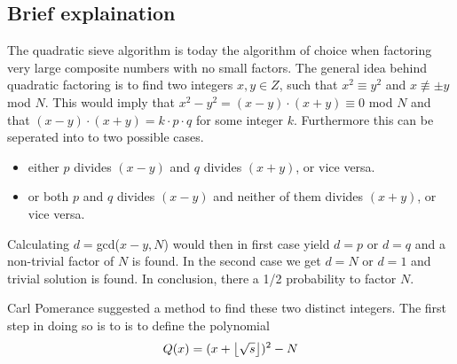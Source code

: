 \subsection{Brief explaination}
The quadratic sieve algorithm is today the algorithm of choice when factoring very large composite numbers
with no small factors. The general idea behind quadratic factoring is to find two integers $x,y \in Z$, such
that $x^2 \equiv y^2$ and $x \not\equiv \pm y$ mod $N$. This would imply that $x^2-y^2 = (x-y) \cdot (x+y) \equiv 0$ mod $N$ and 
that $(x-y) \cdot (x+y) = k \cdot p \cdot q$ for some integer $k$. Furthermore this can be seperated into to two possible cases.

\begin{itemize}
	\item either $p$ divides $(x-y)$ and $q$ divides $(x+y)$, or vice versa.
	\item or both $p$ and $q$ divides $(x-y)$ and neither of them divides $(x+y)$, or vice versa.
\end{itemize}


Calculating $d=$gcd($x-y,N$) would then in first case yield $d = p$ or $d = q$ and a non-trivial factor of 
$N$ is found. In the second case we get $d = N$ or $d = 1$ and trivial solution is found. In conclusion,
there a 1/2 probability to factor $N$.

Carl Pomerance suggested a method to find these two distinct integers\cite{Pomerance1985}. The first step in
doing so is to is to define the polynomial 
\begin{equation}
Q(x) = (x + \left \lfloor \sqrt{s} \right \rfloor)^2-N 
\end{equation}